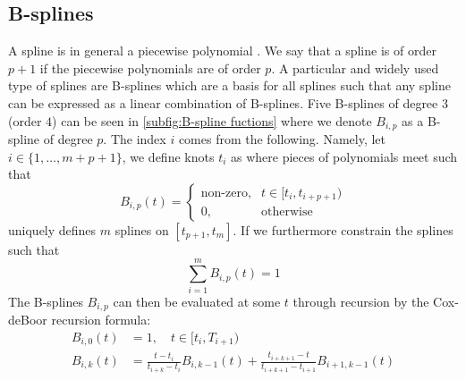 \documentclass[../Thesis.tex]{subfiles}
\begin{document}
\subsection{B-splines}
A spline is in general a piecewise polynomial \cite{A-Practical-Guide-to-Splines}. We say that a spline is of order $p+1$ if the piecewise polynomials are of order $p$. A particular and widely used type of splines are B-splines which are a basis for all splines such that any spline can be expressed as a linear combination of B-splines. Five B-splines of degree $3$ (order $4$) can be seen in \autoref{subfig:B-spline fuctions} where we denote $B_{i,p}$ as a B-spline of degree $p$. The index $i$ comes from the following. Namely, let $i \in \{1,\dots, m + p + 1\}$, we define knots $t_i$ as where pieces of polynomials meet such that
$$B_{i,p} \left(t\right) = \begin{cases}
        \text{non-zero}, & t\in [t_i, t_{i+p+1}) \\
        0,               & \text{otherwise}
    \end{cases}$$
uniquely defines $m$ splines on $[t_{p+1}, t_{m}]$. If we furthermore constrain the splines such that
$$\sum_{i=1}^{m} B_{i,p} \left(t\right) = 1$$
The B-splines $B_{i,p}$ can then be evaluated at some $t$ through recursion by the Cox-deBoor recursion formula:
\begin{align}
    B_{i,0}\left(t\right) & = 1, \quad t\in [t_i, T_{i+1})                                                                                                \\
    B_{i,k}\left(t\right) & = \frac{t-t_i}{t_{i+k} - t_{i}} B_{i,k-1}\left(t\right) + \frac{t_{i+k+1} - t}{t_{i+k+1} - t_{i+1}} B_{i+1,k-1}\left(t\right)
\end{align}
\end{document}
